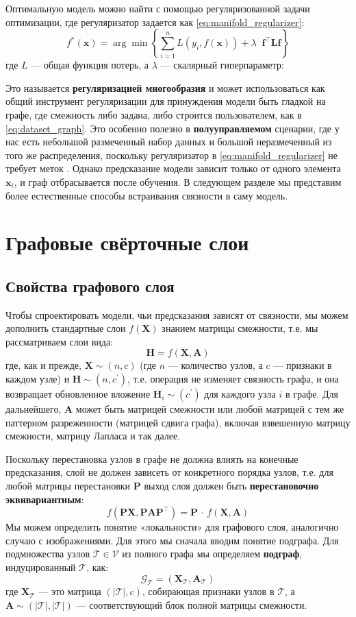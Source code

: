 Оптимальную модель можно найти с помощью регуляризованной задачи оптимизации, где регуляризатор задается как \eqref{eq:manifold_regularizer}:
%
$$
f^*(\mathbf{x})=\arg\min \left\{\sum_{i=1}^nL(y_i, f(\mathbf{x}))  + \lambda \;\;\mathbf{f}^\top \mathbf{L}\mathbf{f}\right\}
$$
%
где $L$ — общая функция потерь, а $\lambda$ — скалярный гиперпараметр:

Это называется \textbf{регуляризацией многообразия} \cite{belkin2006manifold} и может использоваться как общий инструмент регуляризации для принуждения модели быть гладкой на графе, где смежность либо задана, либо строится пользователем, как в \eqref{eq:dataset_graph}. Это особенно полезно в \textbf{полууправляемом} сценарии, где у нас есть небольшой размеченный набор данных и большой неразмеченный из того же распределения, поскольку регуляризатор в \eqref{eq:manifold_regularizer} не требует меток \cite{belkin2006manifold}. Однако предсказание модели зависит только от одного элемента $\mathbf{x}_i$, и граф отбрасывается после обучения. В следующем разделе мы представим более естественные способы встраивания связности в саму модель.

\section{Графовые свёрточные слои}
\subsection{Свойства графового слоя}

Чтобы спроектировать модели, чьи предсказания зависят от связности, мы можем дополнить стандартные слои $f(\mathbf{X})$ знанием матрицы смежности, т.е. мы рассматриваем слои вида:
%
$$
\mathbf{H} =f(\mathbf{X}, \mathbf{A})
$$
%
где, как и прежде, $\mathbf{X} \sim (n, c)$ (где $n$ — количество узлов, а $c$ — признаки в каждом узле) и $\mathbf{H} \sim (n, c^\prime)$, т.е. операция не изменяет связность графа, и она возвращает обновленное вложение $\mathbf{H}_i \sim (c^\prime)$ для каждого узла $i$ в графе. Для дальнейшего, $\mathbf{A}$ может быть матрицей смежности или любой матрицей с тем же паттерном разреженности (матрицей сдвига графа), включая взвешенную матрицу смежности, матрицу Лапласа и так далее.

Поскольку перестановка узлов в графе не должна влиять на конечные предсказания, слой не должен зависеть от конкретного порядка узлов, т.е. для любой матрицы перестановки $\mathbf{P}$ выход слоя должен быть \textbf{перестановочно эквивариантным}:
%
$$
f(\mathbf{P}\mathbf{X}, \mathbf{P}\mathbf{A}\mathbf{P}^\top)=\mathbf{P}\,\cdot\,f(\mathbf{X}, \mathbf{A})
$$
%
Мы можем определить понятие «локальности» для графового слоя, аналогично случаю с изображениями. Для этого мы сначала вводим понятие подграфа. Для подмножества узлов $\mathcal{T} \in \mathcal{V}$ из полного графа мы определяем \textbf{подграф}, индуцированный $\mathcal{T}$, как:
%
$$
\mathcal{G}_{\mathcal{T}}= (\mathbf{X}_{\mathcal{T}}, \mathbf{A}_{\mathcal{T}})
$$
%
где $\mathbf{X}_{\mathcal{T}}$ — это матрица $(\lvert\mathcal{T}\rvert,c)$, собирающая признаки узлов в $\mathcal{T}$, а $\mathbf{A} \sim (\lvert\mathcal{T}\rvert,\lvert\mathcal{T}\rvert)$ — соответствующий блок полной матрицы смежности.


